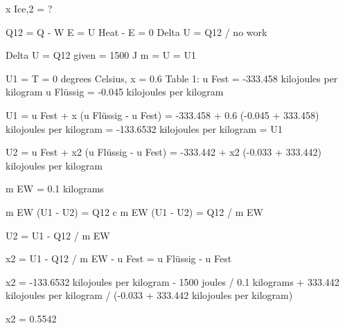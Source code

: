 x Ice,2 = ?  

Q12 = Q - W  
E = U Heat - E = 0  
Delta U = Q12 / no work  

Delta U = Q12 given = 1500 J  
m = U = U1  

U1 =  
T = 0 degrees Celsius, x = 0.6  
Table 1:  
u Fest = -333.458 kilojoules per kilogram  
u Flüssig = -0.045 kilojoules per kilogram  

U1 = u Fest + x (u Flüssig - u Fest)  
= -333.458 + 0.6 (-0.045 + 333.458) kilojoules per kilogram  
= -133.6532 kilojoules per kilogram = U1  

U2 = u Fest + x2 (u Flüssig - u Fest)  
= -333.442 + x2 (-0.033 + 333.442) kilojoules per kilogram  

m EW = 0.1 kilograms  

m EW (U1 - U2) = Q12  
c m EW (U1 - U2) = Q12 / m EW  

U2 = U1 - Q12 / m EW  

x2 = U1 - Q12 / m EW - u Fest  
= u Flüssig - u Fest  

x2 = -133.6532 kilojoules per kilogram - 1500 joules / 0.1 kilograms + 333.442 kilojoules per kilogram  
/ (-0.033 + 333.442 kilojoules per kilogram)  

x2 = 0.5542